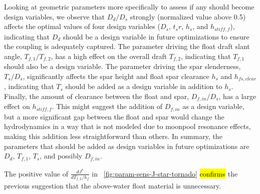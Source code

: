 Looking at geometric parameters more specifically to assess if any should become design variables, we observe that $D_d/D_s$ strongly (normalized value above 0.5) affects the optimal values of four design variables ($D_s$, $t_sr$, $h_s$, and $h_{stiff,f}$), indicating that $D_d$ should be a design variable in future optimizations to ensure the coupling is adequately captured.
The parameter driving the float draft slant angle, $T_{f,1}/T_{f,2}$, has a high effect on the overall draft $T_{f,2}$, indicating that $T_{f,1}$ should also be a design variable.
The parameter driving the spar slenderness, $T_s/D_s$, significantly affects the spar height and float spar clearance $h_s$ and $h_{fs,clear}$, indicating that $T_s$ should be added as a design variable in addition to $h_s$.
Finally, the amount of clearance between the float and spar, $D_{f,in}/D_s$, has a large effect on  $h_{stiff,f}$.
This might suggest the addition of $D_{f,in}$ as a design variable, but a more significant gap between the float and spar would change the hydrodynamics in a way that is not modeled due to moonpool resonance effects, making this addition less straightforward than others. 
In summary, the parameters that should be added as design variables in future optimizations are $D_d$, $T_{f,1}$, $T_s$, and possibly $D_{f,in}$.


The positive value of $\frac{dJ^*}{dT_{f,2}/h_f}$ in \figureautorefname~\ref{fig:param-sens-J-star-tornado} \hl{confirms} the previous suggestion that the above-water float material is unnecessary.


